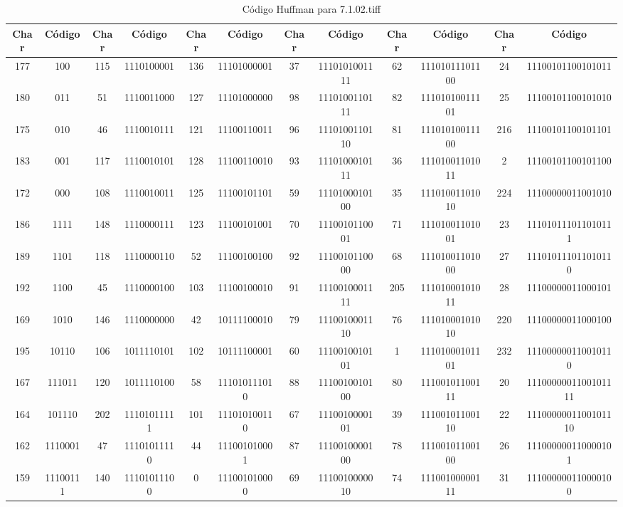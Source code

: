 \documentclass[conference,onecolumn,12pt]{IEEEtran}
\numberwithin{equation}{subsection}
\begin{document}
\begin{itemize}
    \begin{table}[H]
\centering
\caption{Código Huffman para 7.1.02.tiff}
\label{tab:huffman_7.1.02.tiff}
\begin{tabular}{cccccccccccc}
\toprule
\textbf{Char} & \textbf{Código} & \textbf{Char} & \textbf{Código} & \textbf{Char} & \textbf{Código} & \textbf{Char} & \textbf{Código} & \textbf{Char} & \textbf{Código} & \textbf{Char} & \textbf{Código} \\
\midrule
177 & 100 & 115 & 1110100001 & 136 & 11101000001 & 37 & 1110101001111 & 62 & 11101011101100 & 24 & 11100101100101011 \\
180 & 011 & 51 & 1110011000 & 127 & 11101000000 & 98 & 1110100110111 & 82 & 11101010011101 & 25 & 11100101100101010 \\
175 & 010 & 46 & 1110010111 & 121 & 11100110011 & 96 & 1110100110110 & 81 & 11101010011100 & 216 & 11100101100101101 \\
183 & 001 & 117 & 1110010101 & 128 & 11100110010 & 93 & 1110100010111 & 36 & 11101001101011 & 2 & 11100101100101100 \\
172 & 000 & 108 & 1110010011 & 125 & 11100101101 & 59 & 1110100010100 & 35 & 11101001101010 & 224 & 11100000011001010 \\
186 & 1111 & 148 & 1110000111 & 123 & 11100101001 & 70 & 1110010110001 & 71 & 11101001101001 & 23 & 111010111011010111 \\
189 & 1101 & 118 & 1110000110 & 52 & 11100100100 & 92 & 1110010110000 & 68 & 11101001101000 & 27 & 111010111011010110 \\
192 & 1100 & 45 & 1110000100 & 103 & 11100100010 & 91 & 1110010001111 & 205 & 11101000101011 & 28 & 11100000011000101 \\
169 & 1010 & 146 & 1110000000 & 42 & 10111100010 & 79 & 1110010001110 & 76 & 11101000101010 & 220 & 11100000011000100 \\
195 & 10110 & 106 & 1011110101 & 102 & 10111100001 & 60 & 1110010010101 & 1 & 11101000101101 & 232 & 111000000110010110 \\
167 & 111011 & 120 & 1011110100 & 58 & 111010111010 & 88 & 1110010010100 & 80 & 11100101100111 & 20 & 1110000001100101111 \\
164 & 101110 & 202 & 11101011111 & 101 & 111010100110 & 67 & 1110010000101 & 39 & 11100101100110 & 22 & 1110000001100101110 \\
162 & 1110001 & 47 & 11101011110 & 44 & 111001010001 & 87 & 1110010000100 & 78 & 11100101100100 & 26 & 111000000110000101 \\
159 & 11100111 & 140 & 11101011100 & 0 & 111001010000 & 69 & 1110010000010 & 74 & 11100100000111 & 31 & 111000000110000100 \\

\end{tabular}
\end{table}
\end{itemize}
\end{document}
